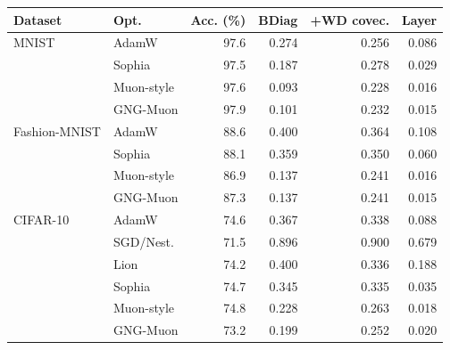 \begin{tabular}{llrrrr}
\toprule
Dataset & Opt. & Acc. (\%) & BDiag & +WD covec. & Layer \\
\midrule
MNIST & AdamW & 97.6 & 0.274 & 0.256 & 0.086 \\
 & Sophia & 97.5 & 0.187 & 0.278 & 0.029 \\
 & Muon-style & 97.6 & 0.093 & 0.228 & 0.016 \\
 & GNG-Muon & 97.9 & 0.101 & 0.232 & 0.015 \\
\midrule
Fashion-MNIST & AdamW & 88.6 & 0.400 & 0.364 & 0.108 \\
 & Sophia & 88.1 & 0.359 & 0.350 & 0.060 \\
 & Muon-style & 86.9 & 0.137 & 0.241 & 0.016 \\
 & GNG-Muon & 87.3 & 0.137 & 0.241 & 0.015 \\
\midrule
CIFAR-10 & AdamW & 74.6 & 0.367 & 0.338 & 0.088 \\
 & SGD/Nest. & 71.5 & 0.896 & 0.900 & 0.679 \\
 & Lion & 74.2 & 0.400 & 0.336 & 0.188 \\
 & Sophia & 74.7 & 0.345 & 0.335 & 0.035 \\
 & Muon-style & 74.8 & 0.228 & 0.263 & 0.018 \\
 & GNG-Muon & 73.2 & 0.199 & 0.252 & 0.020 \\
\bottomrule
\end{tabular}
